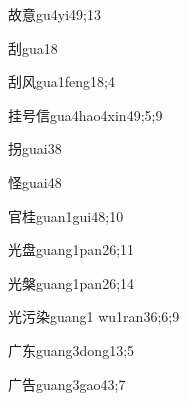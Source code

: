 \begin{verbete}{故意}{gu4yi4}{9;13}
\end{verbete}

\begin{verbete}{刮}{gua1}{8}
\end{verbete}

\begin{verbete}{刮风}{gua1feng1}{8;4}
\end{verbete}

\begin{verbete}{挂号信}{gua4hao4xin4}{9;5;9}
\end{verbete}

\begin{verbete}{拐}{guai3}{8}
\end{verbete}

\begin{verbete}{怪}{guai4}{8}
\end{verbete}

\begin{verbete}{官桂}{guan1gui4}{8;10}
\end{verbete}

\begin{verbete}{光盘}{guang1pan2}{6;11}
\end{verbete}

\begin{verbete}{光槃}{guang1pan2}{6;14}
\end{verbete}

\begin{verbete}{光污染}{guang1 wu1ran3}{6;6;9}
\end{verbete}

\begin{verbete}{广东}{guang3dong1}{3;5}
\end{verbete}

\begin{verbete}{广告}{guang3gao4}{3;7}
\end{verbete}

